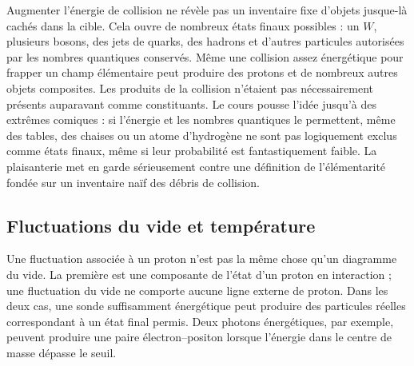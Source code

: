Augmenter l’énergie de collision ne révèle pas un inventaire fixe d’objets jusque-là cachés dans la cible. Cela ouvre de nombreux états finaux possibles : un \(W\), plusieurs bosons, des jets de quarks, des hadrons et d’autres particules autorisées par les nombres quantiques conservés. Même une collision assez énergétique pour frapper un champ élémentaire peut produire des protons et de nombreux autres objets composites. Les produits de la collision n’étaient pas nécessairement présents auparavant comme constituants. Le cours pousse l’idée jusqu’à des extrêmes comiques : si l’énergie et les nombres quantiques le permettent, même des tables, des chaises ou un atome d’hydrogène ne sont pas logiquement exclus comme états finaux, même si leur probabilité est fantastiquement faible. La plaisanterie met en garde sérieusement contre une définition de l’élémentarité fondée sur un inventaire naïf des débris de collision.

\subsection{Fluctuations du vide et température}

Une fluctuation associée à un proton n’est pas la même chose qu’un diagramme du vide. La première est une composante de l’état d’un proton en interaction ; une fluctuation du vide ne comporte aucune ligne externe de proton. Dans les deux cas, une sonde suffisamment énergétique peut produire des particules réelles correspondant à un état final permis. Deux photons énergétiques, par exemple, peuvent produire une paire électron--positon lorsque l’énergie dans le centre de masse dépasse le seuil.

\begin{classroomqa}
\end{classroomqa}

